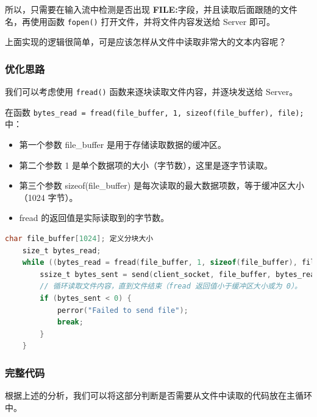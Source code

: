 \documentclass[14pt,a4paper,UTF8,twoside]{article}
\begin{document}
所以，只需要在输入流中检测是否出现 \textbf{FILE:}字段，并且读取后面跟随的文件名，再使用函数 \texttt{fopen()} 打开文件，并将文件内容发送给 Server 即可。

上面实现的逻辑很简单，可是应该怎样从文件中读取非常大的文本内容呢？

\subsubsection*{优化思路}

我们可以考虑使用 \texttt{fread()} 函数来逐块读取文件内容，并逐块发送给 Server。

\begin{ctt}
    在函数 \texttt{bytes\_read = fread(file\_buffer, 1, sizeof(file\_buffer), file);} 中：
    \begin{itemize}
        \item 第一个参数 file\_buffer 是用于存储读取数据的缓冲区。
        \item 第二个参数 1 是单个数据项的大小（字节数），这里是逐字节读取。
        \item 第三个参数 sizeof(file\_buffer) 是每次读取的最大数据项数，等于缓冲区大小（1024 字节）。
        \item fread 的返回值是实际读取到的字节数。
    \end{itemize}
\end{ctt}

\begin{lstlisting}[language=C, title={Read from File}]
    char file_buffer[1024]; 定义分块大小
    size_t bytes_read;
    while ((bytes_read = fread(file_buffer, 1, sizeof(file_buffer), file)) > 0) {
        ssize_t bytes_sent = send(client_socket, file_buffer, bytes_read, 0); // 逐块发送文件内容
        // 循环读取文件内容，直到文件结束（fread 返回值小于缓冲区大小或为 0）。
        if (bytes_sent < 0) {
            perror("Failed to send file");
            break;
        }
    }
\end{lstlisting}

\subsubsection*{完整代码}

根据上述的分析，我们可以将这部分判断是否需要从文件中读取的代码放在主循环中。
\end{document}
